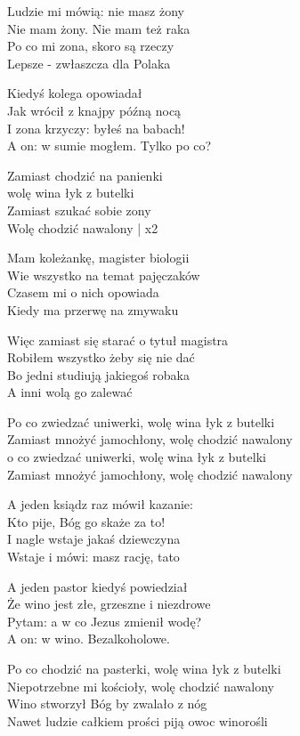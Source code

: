 \begin{text}
    Ludzie mi mówią: nie masz żony\\
    Nie mam żony. Nie mam też raka\\
    Po co mi zona, skoro są rzeczy\\
    Lepsze - zwłaszcza dla Polaka

    Kiedyś kolega opowiadał\\
    Jak wrócił z knajpy późną nocą\\
    I zona krzyczy: byłeś na babach!\\
    A on: w sumie mogłem. Tylko po co?

    \vin Zamiast chodzić na panienki\\
	\vin wolę wina łyk z butelki\\
    \vin Zamiast szukać sobie zony\\
	\vin Wolę chodzić nawalony | x2

    Mam koleżankę, magister biologii\\
    Wie wszystko na temat pajęczaków\\
    Czasem mi o nich opowiada\\
    Kiedy ma przerwę na zmywaku

    Więc zamiast się starać o tytuł magistra\\
    Robiłem wszystko żeby się nie dać\\
    Bo jedni studiują jakiegoś robaka\\
    A inni wolą go zalewać

    \vin Po co zwiedzać uniwerki, wolę wina łyk z butelki\\
    \vin Zamiast mnożyć jamochłony, wolę chodzić nawalony\\
	\vin o co zwiedzać uniwerki, wolę wina łyk z butelki\\
    \vin Zamiast mnożyć jamochłony, wolę chodzić nawalony

    A jeden ksiądz raz mówił kazanie:\\
    Kto pije, Bóg go skaże za to!\\
    I nagle wstaje jakaś dziewczyna\\
    Wstaje i mówi: masz rację, tato

    A jeden pastor kiedyś powiedział\\
    Że wino jest złe, grzeszne i niezdrowe\\
    Pytam: a w co Jezus zmienił wodę?\\
    A on: w wino. Bezalkoholowe.

    \vin Po co chodzić na pasterki, wolę wina łyk z butelki\\
    \vin Niepotrzebne mi kościoły, wolę chodzić nawalony\\	
    \vin Wino stworzył Bóg by zwalało z nóg\\
    \vin Nawet ludzie całkiem prości piją owoc winorośli

\end{text}
